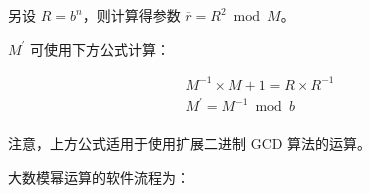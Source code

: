 \documentclass[main\_\_CN.tex]{subfiles}
\begin{document}
另设 \begin{math}R = b^{n}\end{math}，则计算得参数 \begin{math}\overline{r} = R^{2} \bmod M\end{math}。

\begin{math}M^{\prime}\end{math} 可使用下方公式计算：

\begin{gather*}
        M^{-1} \times M + 1 = R \times R^{-1} \\
        M^{\prime} = M^{-1} \bmod b\\
\end{gather*}

注意，上方公式适用于使用扩展二进制 GCD 算法的运算。

大数模幂运算的软件流程为：
\end{document}
